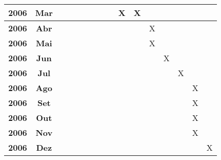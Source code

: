 \documentclass[a4paper,titlepage,12pt]{article}
\begin{document}
\begin{table}[ht]
\begin{center}
\begin{tabular}{|c|c||c|c|c|c|c|c|c|c|c|c|c|c|c|c|}
      {\bf 2006} &{\bf Mar}  &         &         &        &         &         &         &        & X       & X       &         &          &          &          &        \\\hline
      {\bf 2006} &{\bf Abr}  &         &         &        &         &         &         &        &         &         & X       &          &          &          &        \\\hline
      {\bf 2006} &{\bf Mai}  &         &         &        &         &         &         &        &         &         & X       &          &          &          &        \\\hline
      {\bf 2006} &{\bf Jun}  &         &         &        &         &         &         &        &         &         &         & X        &          &          &        \\\hline
      {\bf 2006} &{\bf Jul}  &         &         &        &         &         &         &        &         &         &         &          & X        &          &        \\\hline
      {\bf 2006} &{\bf Ago}  &         &         &        &         &         &         &        &         &         &         &          &          &  X       &        \\\hline
      {\bf 2006} &{\bf Set}  &         &         &        &         &         &         &        &         &         &         &          &          &  X       &        \\\hline
      {\bf 2006} &{\bf Out}  &         &         &        &         &         &         &        &         &         &         &          &          &  X       &        \\\hline
      {\bf 2006} &{\bf Nov}  &         &         &        &         &         &         &        &         &         &         &          &          &  X       &        \\\hline
      {\bf 2006} &{\bf Dez}  &         &         &        &         &         &         &        &         &         &         &          &          &          & X      \\\hline
    \end{tabular}
  \end{center}
\end{table}

\newpage

\end{document}
